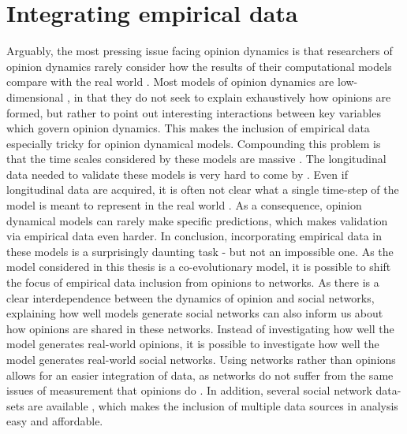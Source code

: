 \documentclass[11pt]{article}
\begin{document}
\part{Integrating empirical data}
Arguably, the most pressing issue facing opinion dynamics is that researchers of opinion dynamics rarely consider how the results of their computational models compare with the real world \cite{flache_between_2018}. Most models of opinion dynamics are low-dimensional \cite{bener_empirical_2016}, in that they do not seek to explain exhaustively how opinions are formed, but rather to point out interesting interactions between key variables which govern opinion dynamics. This makes the inclusion of empirical data especially tricky for opinion dynamical models. Compounding this problem is that the time scales considered by these models are massive \cite{flache_models_2017, galesic_integrating_2021}. The longitudinal data needed to validate these models is very hard to come by \cite{mas2019challenges, kossinets_origins_2009}. Even if longitudinal data are acquired, it is often not clear what a single time-step of the model is meant to represent in the real world \cite{mas2019challenges}. As a consequence, opinion dynamical models can rarely make specific predictions, which makes validation via empirical data even harder. In conclusion, incorporating empirical data in these models is a surprisingly daunting task - but not an impossible one. As the model considered in this thesis is a co-evolutionary model, it is possible to shift the focus of empirical data inclusion from opinions to networks. As there is a clear interdependence between the dynamics of opinion and social networks, explaining how well models generate social networks can also inform us about how opinions are shared in these networks. Instead of investigating how well the model generates real-world opinions, it is possible to investigate how well the model generates real-world social networks. Using networks rather than opinions allows for an easier integration of data, as networks do not suffer from the same issues of measurement that opinions do \cite{best2007measuring}. In addition, several social network data-sets are available \cite{rossi_network_2015}, which makes the inclusion of multiple data sources in analysis easy and affordable. 
\end{document}
